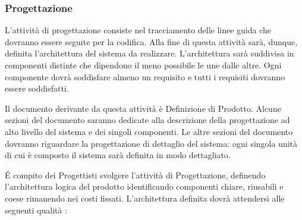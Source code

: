 \subsubsection{Progettazione}

L'attività di progettazione consiste nel tracciamento delle linee
guida che dovranno essere seguite per la codifica. Alla fine di questa
attività sarà, dunque, definita l'architettura del sistema da
realizzare. L'architettura sarà suddivisa in componenti distinte che
dipendono il meno possibile le une dalle altre. Ogni componente dovrà
soddisfare almeno un requisito e tutti i requisiti dovranno essere
soddisfatti. 

Il documento derivante da questa attività è Definizione di Prodotto. Alcune sezioni del documento saranno dedicate alla descrizione della progettazione ad alto livello del
sistema e dei singoli componenti. Le altre sezioni del documento dovranno riguardare la progettazione di dettaglio del sistema: ogni singola unità di cui è composto il sistema sarà definita in modo dettagliato. 

\'E compito dei Progettisti svolgere l'attività di Progettazione, definendo l'architettura logica del prodotto identificando componenti chiare, riusabili e coese rimanendo nei costi fissati. L'architettura definita dovrà  attendersi alle seguenti qualità : 

